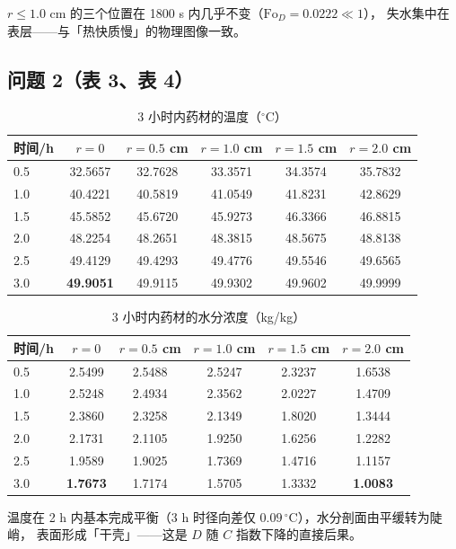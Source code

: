 \documentclass[11pt,a4paper]{article}
\theoremstyle{definition}
\begin{document}
$r\le1.0$ cm 的三个位置在 1800 s 内几乎不变（$\mathrm{Fo}_D=0.0222\ll1$），
失水集中在表层——与「热快质慢」的物理图像一致。

\subsection{问题 2（表 3、表 4）}

\begin{table}[H]
\centering
\small
\caption{3 小时内药材的温度（$^\circ$C）}
\begin{tabular}{@{}lccccc@{}}
\toprule
时间/h & $r=0$ & $r=0.5$ cm & $r=1.0$ cm & $r=1.5$ cm & $r=2.0$ cm \\
\midrule
0.5 & 32.5657 & 32.7628 & 33.3571 & 34.3574 & 35.7832 \\
1.0 & 40.4221 & 40.5819 & 41.0549 & 41.8231 & 42.8629 \\
1.5 & 45.5852 & 45.6720 & 45.9273 & 46.3366 & 46.8815 \\
2.0 & 48.2254 & 48.2651 & 48.3815 & 48.5675 & 48.8138 \\
2.5 & 49.4129 & 49.4293 & 49.4776 & 49.5546 & 49.6565 \\
3.0 & \textbf{49.9051} & 49.9115 & 49.9302 & 49.9602 & 49.9999 \\
\bottomrule
\end{tabular}
\end{table}

\begin{table}[H]
\centering
\small
\caption{3 小时内药材的水分浓度（kg/kg）}
\begin{tabular}{@{}lccccc@{}}
\toprule
时间/h & $r=0$ & $r=0.5$ cm & $r=1.0$ cm & $r=1.5$ cm & $r=2.0$ cm \\
\midrule
0.5 & 2.5499 & 2.5488 & 2.5247 & 2.3237 & 1.6538 \\
1.0 & 2.5248 & 2.4934 & 2.3562 & 2.0227 & 1.4709 \\
1.5 & 2.3860 & 2.3258 & 2.1349 & 1.8020 & 1.3444 \\
2.0 & 2.1731 & 2.1105 & 1.9250 & 1.6256 & 1.2282 \\
2.5 & 1.9589 & 1.9025 & 1.7369 & 1.4716 & 1.1157 \\
3.0 & \textbf{1.7673} & 1.7174 & 1.5705 & 1.3332 & \textbf{1.0083} \\
\bottomrule
\end{tabular}
\end{table}

温度在 2 h 内基本完成平衡（3 h 时径向差仅 $0.09\,^\circ$C），水分剖面由平缓转为陡峭，
表面形成「干壳」——这是 $D$ 随 $C$ 指数下降的直接后果。
\end{document}
